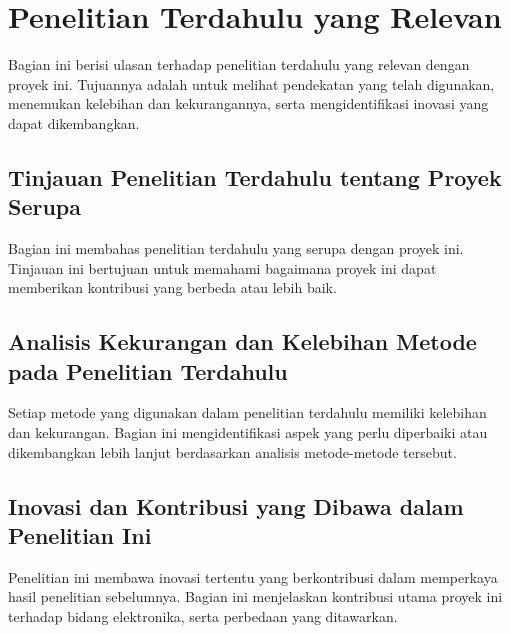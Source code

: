 \section{Penelitian Terdahulu yang Relevan}
Bagian ini berisi ulasan terhadap penelitian terdahulu yang relevan dengan proyek ini. Tujuannya adalah untuk melihat pendekatan yang telah digunakan, menemukan kelebihan dan kekurangannya, serta mengidentifikasi inovasi yang dapat dikembangkan.

\subsection{Tinjauan Penelitian Terdahulu tentang Proyek Serupa}
Bagian ini membahas penelitian terdahulu yang serupa dengan proyek ini. Tinjauan ini bertujuan untuk memahami bagaimana proyek ini dapat memberikan kontribusi yang berbeda atau lebih baik.

\subsection{Analisis Kekurangan dan Kelebihan Metode pada Penelitian Terdahulu}
Setiap metode yang digunakan dalam penelitian terdahulu memiliki kelebihan dan kekurangan. Bagian ini mengidentifikasi aspek yang perlu diperbaiki atau dikembangkan lebih lanjut berdasarkan analisis metode-metode tersebut.

\subsection{Inovasi dan Kontribusi yang Dibawa dalam Penelitian Ini}
Penelitian ini membawa inovasi tertentu yang berkontribusi dalam memperkaya hasil penelitian sebelumnya. Bagian ini menjelaskan kontribusi utama proyek ini terhadap bidang elektronika, serta perbedaan yang ditawarkan.